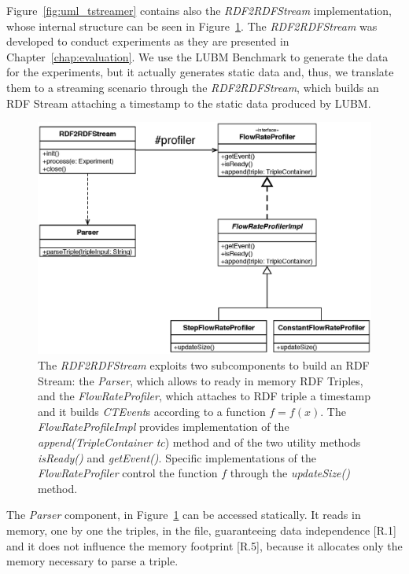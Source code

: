 \noindent Figure~\ref{fig:uml_tstreamer} contains also the \textit{RDF2RDFStream} implementation, whose internal structure can be seen in Figure~\ref{fig:uml_flowrateprofiler}. The \textit{RDF2RDFStream} was developed to conduct experiments as they are presented in Chapter~\ref{chap:evaluation}.  We use the LUBM Benchmark to generate the data for the experiments, but it actually generates static data and, thus, we translate them to a streaming scenario through the \textit{RDF2RDFStream}, which builds an RDF Stream attaching a timestamp to the static data produced by LUBM. %

\begin{figure}[tbh]
  \centering
	\includegraphics[width=0.75\linewidth]{images/uml_flowrateprofiler}
	\caption[Internal Components of \textit{RDF2RDFStream} - UML Schema]{The \textit{RDF2RDFStream} exploits two subcomponents to build an RDF Stream: the \textit{Parser}, which allows to ready in memory RDF Triples, and the \textit{FlowRateProfiler}, which attaches to RDF triple a timestamp and it builds \textit{CTEvent}s according to a function $f=f(x)$. The \textit{FlowRateProfileImpl} provides implementation of the \textit{append(TripleContainer tc}) method and of the two utility methods \textit{isReady()} and \textit{getEvent()}. Specific implementations of the \textit{FlowRateProfiler} control the function $f$ through the \textit{updateSize()} method.} 
  	\label{fig:uml_flowrateprofiler}
\end{figure}


The \textit{Parser} component, in Figure~\ref{fig:uml_flowrateprofiler} can be accessed statically. It reads in memory, one by one the triples, in the file, guaranteeing data independence [R.1] and it does not influence the memory footprint [R.5], because it allocates only the memory necessary to parse a triple. 

